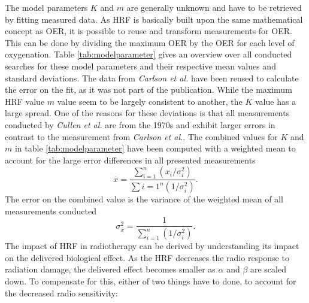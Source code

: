 The model parameters $K$ and $m$ are generally unknown and have to be retrieved by fitting measured data. As HRF is basically built upon the same mathematical concept as OER, it is possible to reuse and transform measurements for OER. This can be done by dividing the maximum OER by the OER for each level of oxygenation. Table \ref{tab:modelparameter} gives an overview over all conducted searches for these model parameters and their respective mean values and standard deviations. The data from \textit{Carlson et al.}\cite{pmid21183291} have been reused to calculate the error on the fit, as it was not part of the publication. While the maximum HRF value $m$ value seem to be largely consistent to another, the $K$ value has a large spread. One of the reasons for these deviations is that all measurements conducted by \textit{Cullen et al.}\cite{pmid4616914, pmid1084867} are from the 1970s and exhibit larger errors in contrast to the measurement from  \textit{Carlson et al.}. The combined values for $K$ and $m$ in table \ref{tab:modelparameter} have been computed with a weighted mean to account for the large error differences in all presented measurements
\begin{equation}
\overline x = \frac{\sum\limits_{i=1}^n(x_i/\sigma_i^2)}{\sum\limits{i=1}^n(1/\sigma_i^2)}.
\end{equation}
The error on the combined value is the variance of the weighted mean of all measurements conducted
\begin{equation}
\sigma^2_{\overline x} = \frac{1}{\sum\limits_{i=1}^n(1/\sigma_i^2)}.
\end{equation}
The impact of HRF in radiotherapy can be derived by understanding its impact on the delivered biological effect. As the HRF decreases the radio response to radiation damage, the delivered effect becomes smaller as $\alpha$ and $\beta$ are scaled down. To compensate for this, either of two things have to done, to account for the decreased radio sensitivity:
